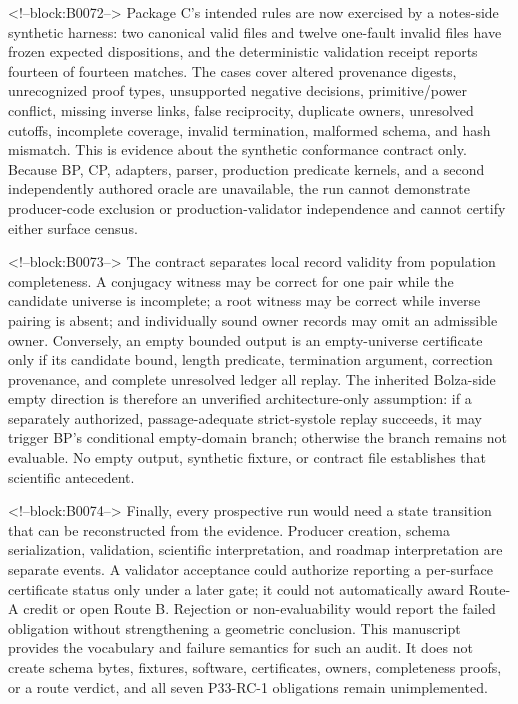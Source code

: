 \documentclass[11pt,a4paper]{article}
\begin{document}
<!--block:B0072-->
Package C's intended rules are now exercised by a notes-side synthetic harness: two canonical valid files and twelve one-fault invalid files have frozen expected dispositions, and the deterministic validation receipt reports fourteen of fourteen matches. The cases cover altered provenance digests, unrecognized proof types, unsupported negative decisions, primitive/power conflict, missing inverse links, false reciprocity, duplicate owners, unresolved cutoffs, incomplete coverage, invalid termination, malformed schema, and hash mismatch. This is evidence about the synthetic conformance contract only. Because BP, CP, adapters, parser, production predicate kernels, and a second independently authored oracle are unavailable, the run cannot demonstrate producer-code exclusion or production-validator independence and cannot certify either surface census.

<!--block:B0073-->
The contract separates local record validity from population completeness. A conjugacy witness may be correct for one pair while the candidate universe is incomplete; a root witness may be correct while inverse pairing is absent; and individually sound owner records may omit an admissible owner. Conversely, an empty bounded output is an empty-universe certificate only if its candidate bound, length predicate, termination argument, correction provenance, and complete unresolved ledger all replay. The inherited Bolza-side empty direction is therefore an unverified architecture-only assumption: if a separately authorized, passage-adequate strict-systole replay succeeds, it may trigger BP's conditional empty-domain branch; otherwise the branch remains not evaluable. No empty output, synthetic fixture, or contract file establishes that scientific antecedent.

<!--block:B0074-->
Finally, every prospective run would need a state transition that can be reconstructed from the evidence. Producer creation, schema serialization, validation, scientific interpretation, and roadmap interpretation are separate events. A validator acceptance could authorize reporting a per-surface certificate status only under a later gate; it could not automatically award Route-A credit or open Route B. Rejection or non-evaluability would report the failed obligation without strengthening a geometric conclusion. This manuscript provides the vocabulary and failure semantics for such an audit. It does not create schema bytes, fixtures, software, certificates, owners, completeness proofs, or a route verdict, and all seven P33-RC-1 obligations remain unimplemented.
\end{document}

